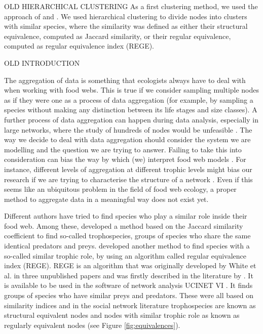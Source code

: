 OLD HIERARCHICAL CLUSTERING
    As a first clustering method, we used the approach of \citet{Yodzis1999} and \citet{Luczkovich2003}. We used hierarchical clustering to divide nodes into clusters with similar species, where the similarity was defined as either their structural equivalence, computed as Jaccard similarity, or their regular equivalence, computed as regular equivalence index (REGE).

OLD INTRODUCTION
    \par The aggregation of data is something that ecologists always have to deal with when working with food webs. This is true if we consider sampling multiple nodes as if they were one as a process of data aggregation (for example, by sampling a species without making any distinction between its life stages and size classes). A further process of data aggregation can happen during data analysis, especially in large networks, where the study of hundreds of nodes would be unfeasible \citep{Yodzis1999}. The way we decide to deal with data aggregation should consider the system we are modelling and the question we are trying to answer. Failing to take this into consideration can bias the way by which (we) interpret food web models \citep{Paine1988,Hall1993}. For instance, different levels of aggregation at different trophic levels might bias our research if we are trying to characterise the structure of a network \citep{Yodzis1999}. Even if this seems like an ubiquitous problem in the field of food web ecology, a proper method to aggregate data in a meaningful way does not exist yet.
    \par Different authors have tried to find species who play a similar role inside their food web. Among these, \citet{Yodzis1999} developed a method based on the Jaccard similarity coefficient to find so-called trophospecies, groups of species who share the same identical predators and preys. \citet{Luczkovich2003} developed another method to find species with a so-called similar trophic role, by using an algorithm called regular equivalence index (REGE). REGE is an algorithm that was originally developed by White et al. in three unpublished papers and was firstly described in the literature by \citet{Borgatti1993}. It is available to be used in the software of network analysis UCINET VI \citep{Borgatti2002}. It finds groups of species who have similar preys and predators. These were all based on similarity indices and in the social network literature trophospecies are known as structural equivalent nodes and nodes with similar trophic role as known as regularly equivalent nodes (see Figure \ref{fig:equivalences}).
